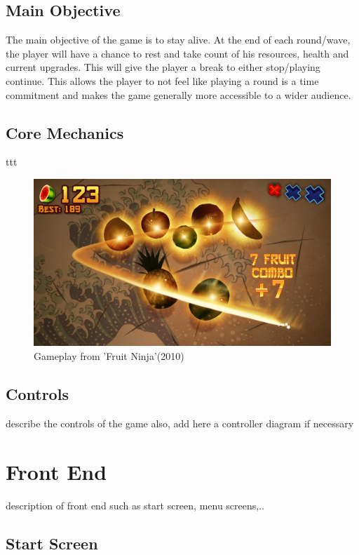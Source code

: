\documentclass[a4paper]{scrreprt}
\begin{document}
\section{Main Objective}
The main objective of the game is to stay alive. At the end of each round/wave, the player will have a chance to rest and take count of his resources, health and current upgrades.
This will give the player a break to either stop/playing continue. This allows the player to not feel like playing a round is a time commitment and makes the game generally more accessible to a wider audience.

\clearpage

\section{Core Mechanics}
ttt
\begin{figure}[h!]
  \centering
  \includegraphics[width=1\textwidth]{FruitNinja}
  \caption{Gameplay from 'Fruit Ninja'(2010)}
  \end{figure}

\section{Controls}
describe the controls of the game 
also, add here a controller diagram if necessary 



\chapter{Front End}
description of front end such as start screen, menu screens,..  

\section{Start Screen}
\end{document}
